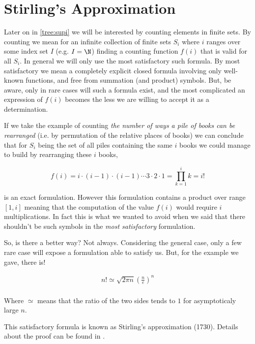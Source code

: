 \section{Stirling's Approximation}
\label{tree:sorting:stirling}

Later on in \ref{tree:supi} we will be interested by counting elements in
finite sets. By counting we mean for an infinite collection of finite sets
$S_i$ where $i$ ranges over some index set $I$ (e.g. $I = \N$) finding a
counting function $f(i)$ that is valid for all $S_i$. In general we will only
use the most satisfactory such formula. By most satisfactory we mean a
completely explicit closed formula involving only well-known functions, and
free from summation (and product) symbols. But, be aware, only in rare cases
will such a formula exist, and the most complicated an expression of $f(i)$
becomes the less we are willing to accept it as a determination.
\cite{Stanley:2011:ECV:2124415}

If we take the example of counting \emph{the number of ways a pile of books can
be rearranged} (i.e. by permutation of the relative places of books) we can
conclude that for $S_i$ being the set of all piles containing the same $i$
books we could manage to build by rearranging these $i$ books,

$$ f(i) = i \cdot (i-1) \cdot (i-1) \cdots 3 \cdot 2 \cdot 1 = \prod_{k=1}^i k = i! $$

is an exact formulation. However this formulation contains a product over range
$[1, i]$ meaning that the computation of the value $f(i)$ would require $i$
multiplications. In fact this is what we wanted to avoid when we said that
there shouldn't be such symbols in the \emph{most satisfactory} formulation.

So, is there a better way? Not always. Considering the general case, only a few
rare case will expose a formulation able to satisfy us. But, for the example we
gave, there is!


\begin{theorem}
\label{tree:sorting:theorem/stirling}
\begin{align*}
n! \simeq \sqrt{2 \pi n} \left(\frac{n}{e}\right)^n\\
\end{align*}
\end{theorem}


Where $\simeq$ means that the ratio of the two sides tends to $1$ for
asymptoticaly large $n$.

This satisfactory formula is known as Stirling's approximation (1730). Details
about the proof can be found in \cite{feller1967direct}.

